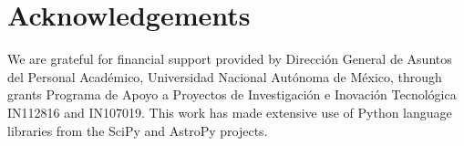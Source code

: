 \documentclass[useAMS, usenatbib, a4paper]{mnras}
\begin{document}






\section*{Acknowledgements}
We are grateful for financial support provided by Dirección General de
Asuntos del Personal Académico, Universidad Nacional Autónoma de
México, through grants Programa de Apoyo a Proyectos de Investigación
e Inovación Tecnológica IN112816 and IN107019.  This work has made
extensive use of Python language libraries from the SciPy
\citep{Jones:2001a} and AstroPy \citep{Astropy-Collaboration:2013a,
  Astropy-Collaboration:2018a} projects.




\appendix


\bsp	%
\label{lastpage}
\end{document}
